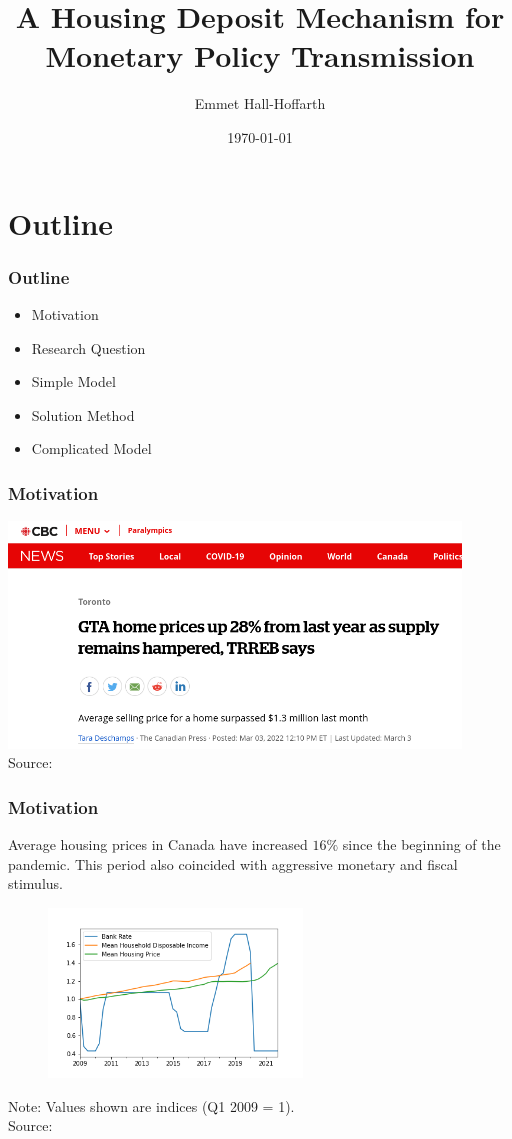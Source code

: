 \documentclass{beamer}
\title[Housing Deposits and Monetary Policy]{A Housing Deposit Mechanism for Monetary Policy Transmission} %
\author{Emmet Hall-Hoffarth} %
\institute[Oxford] %
{
University of Oxford \\ %
\medskip
\textit{emmet.hall-hoffarth@economics.ox.ac.uk} %
}
\date{\today} %
\begin{document}
\newcommand{\SubItem}[1]{
    {\setlength\itemindent{15pt} \item[-] #1}
}

\begin{frame}
    \titlepage %
\end{frame}

\section{Outline}

\begin{frame}
    \frametitle{Outline}
    \begin{itemize}
        \item Motivation
        \item Research Question
        \item Simple Model
        \item Solution Method
        \item Complicated Model
    \end{itemize}
\end{frame}

\begin{frame}
    \frametitle{Motivation}
    \includegraphics[width=12cm]{images/cbc_article.png} \\
    Source: \parencite{deschamps_2022}
\end{frame}

\begin{frame}
    \frametitle{Motivation}
    Average housing prices in Canada have increased $16\%$ since the beginning of the pandemic. This period also coincided with aggressive monetary and fiscal stimulus. \\
    \begin{figure}
        \includegraphics[height=4.5cm]{images/canada_housing.png}
        \centering 
    \end{figure}
    Note: Values shown are indices (Q1 2009 = 1). \\
    Source: \parencite{statcan}
\end{frame}
\end{document}
